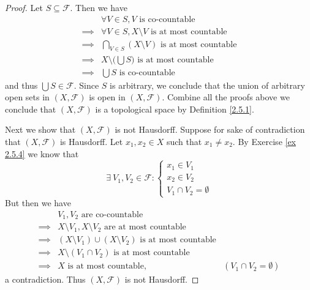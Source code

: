 \begin{proof}
    Let \(S \subseteq \mathcal{F}\).
    Then we have
    \begin{align*}
                 & \forall V \in S, V \text{ is co-countable}                     \\
        \implies & \forall V \in S, X \setminus V \text{ is at most countable}    \\
        \implies & \bigcap_{V \in S} (X \setminus V) \text{ is at most countable} \\
        \implies & X \setminus \bigg(\bigcup S\bigg) \text{ is at most countable} \\
        \implies & \bigcup S \text{ is co-countable}
    \end{align*}
    and thus \(\bigcup S \in \mathcal{F}\).
    Since \(S\) is arbitrary, we conclude that the union of arbitrary open sets in \((X, \mathcal{F})\) is open in \((X, \mathcal{F})\).
    Combine all the proofs above we conclude that \((X, \mathcal{F})\) is a topological space by Definition \ref{2.5.1}.

    Next we show that \((X, \mathcal{F})\) is not Hausdorff.
    Suppose for sake of contradiction that \((X, \mathcal{F})\) is Hausdorff.
    Let \(x_1, x_2 \in X\) such that \(x_1 \neq x_2\).
    By Exercise \ref{ex 2.5.4} we know that
    \[
        \exists\ V_1, V_2 \in \mathcal{F} : \begin{cases}
            x_1 \in V_1 \\
            x_2 \in V_2 \\
            V_1 \cap V_2 = \emptyset
        \end{cases}
    \]
    But then we have
    \begin{align*}
                 & V_1, V_2 \text{ are co-countable}                                                                  \\
        \implies & X \setminus V_1, X \setminus V_2 \text{ are at most countable}                                     \\
        \implies & (X \setminus V_1) \cup (X \setminus V_2) \text{ is at most countable}                              \\
        \implies & X \setminus (V_1 \cap V_2) \text{ is at most countable}                                            \\
        \implies & X \text{ is at most countable},                                       & (V_1 \cap V_2 = \emptyset)
    \end{align*}
    a contradiction.
    Thus \((X, \mathcal{F})\) is not Hausdorff.


\end{proof}
